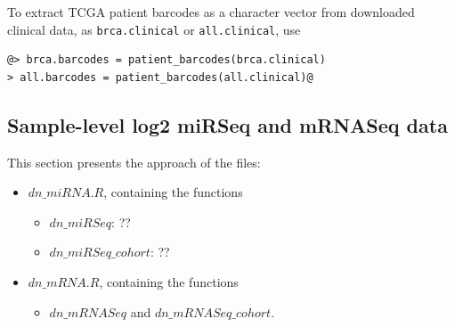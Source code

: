 \documentclass{TechReport}
\begin{document}
To extract TCGA patient barcodes as a character vector from downloaded clinical
data, as {\tt brca.clinical} or {\tt all.clinical}, use
\begin{lstlisting}[style=base]
@> brca.barcodes = patient_barcodes(brca.clinical)
> all.barcodes = patient_barcodes(all.clinical)@
\end{lstlisting}

\subsection{Sample-level log2 miRSeq and mRNASeq data}
This section presents the approach of the files:
\begin{itemize}
\item $dn\_miRNA.R$, containing the functions
  \begin{itemize}
  \item $dn\_miRSeq$: ??
  \item $dn\_miRSeq\_cohort$: ??
  \end{itemize}
\item $dn\_mRNA.R$, containing the functions
  \begin{itemize}
  \item $dn\_mRNASeq$ and $dn\_mRNASeq\_cohort$.
  \end{itemize}
\end{itemize}
\end{document}
